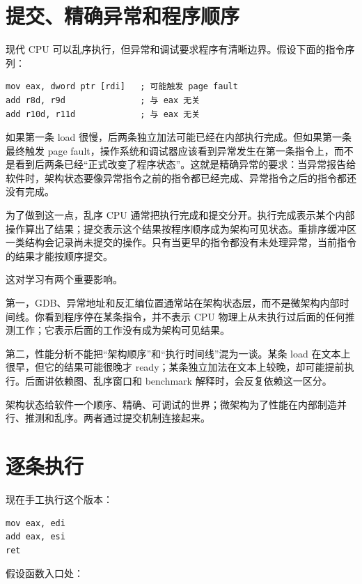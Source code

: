 \section{提交、精确异常和程序顺序}

现代 CPU 可以乱序执行，但异常和调试要求程序有清晰边界。假设下面的指令序列：

\begin{lstlisting}
mov eax, dword ptr [rdi]   ; 可能触发 page fault
add r8d, r9d               ; 与 eax 无关
add r10d, r11d             ; 与 eax 无关
\end{lstlisting}

如果第一条 load 很慢，后两条独立加法可能已经在内部执行完成。但如果第一条最终触发 page fault，操作系统和调试器应该看到异常发生在第一条指令上，而不是看到后两条已经“正式改变了程序状态”。这就是精确异常的要求：当异常报告给软件时，架构状态要像异常指令之前的指令都已经完成、异常指令之后的指令都还没有完成。

为了做到这一点，乱序 CPU 通常把执行完成和提交分开。执行完成表示某个内部操作算出了结果；提交表示这个结果按程序顺序成为架构可见状态。重排序缓冲区一类结构会记录尚未提交的操作。只有当更早的指令都没有未处理异常，当前指令的结果才能按顺序提交。

这对学习有两个重要影响。

第一，GDB、异常地址和反汇编位置通常站在架构状态层，而不是微架构内部时间线。你看到程序停在某条指令，并不表示 CPU 物理上从未执行过后面的任何推测工作；它表示后面的工作没有成为架构可见结果。

第二，性能分析不能把“架构顺序”和“执行时间线”混为一谈。某条 load 在文本上很早，但它的结果可能很晚才 ready；某条独立加法在文本上较晚，却可能提前执行。后面讲依赖图、乱序窗口和 benchmark 解释时，会反复依赖这一区分。

\begin{keyidea}
架构状态给软件一个顺序、精确、可调试的世界；微架构为了性能在内部制造并行、推测和乱序。两者通过提交机制连接起来。
\end{keyidea}

\section{逐条执行 }

现在手工执行这个版本：

\begin{lstlisting}
mov eax, edi
add eax, esi
ret
\end{lstlisting}

假设函数入口处：

